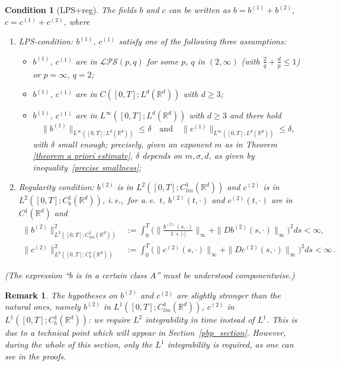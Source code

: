 \documentclass[a4paper,10pt]{article}
\newtheorem{condition}[theorem]{Condition}
\newtheorem{remark}[theorem]{Remark}
\begin{document}
\begin{condition}[LPS+reg]
\label{LPSreg}
The fields $b$ and $c$ can be written as $b=b^{(1)}+b^{(2)}$, $c=c^{(1)}+c^{(2)}$, where 
\begin{enumerate}
\item LPS-condition: $b^{(1)}$, $c^{(1)}$ satisfy one of the following three assumptions:
 \begin{itemize}
   \item[a)] $b^{(1)}$, $c^{(1)}$ are in $\mathcal{LPS}(p,q)$ for some $p$, $q$ in
$(2,\infty)$ (with $\frac2q+\frac{d}{p}\le1$) or $p=\infty$, $q=2$;
   \item[b)] $b^{(1)}$, $c^{(1)}$ are in $C([0,T];L^{d}(\mathbb{R}^{d}))$ with $d \geq 3$;
   \item[c)] $b^{(1)}$, $c^{(1)}$ are in $L^{\infty}([0,T];L^{d}(\mathbb{R}^{d}))$
with $d \geq 3$ and there hold
\[
\|b^{(1)}\|_{L^{\infty}([0,T];L^{d}(\mathbb{R}^{d}))}\le\delta \quad \text{and} \quad
\|c^{(1)}\|_{L^{\infty}([0,T];L^{d}(\mathbb{R}^{d}))} \le\delta,
\]
with $\delta$ small enough; precisely, given an exponent $m$ as in Theorem
\ref{theorem a priori estimate}, $\delta$ depends on $m,\sigma,d$, as given by
inequality~\eqref{precise smallness};
 \end{itemize}
   
\item Regularity condition: $b^{(2)}$ is in $L^{2}([0,T];C^{1}_{lin}(\mathbb{R}^{d}))$ and $c^{(2)}$
is in $L^{2}([0,T];C^{1}_{b}(\mathbb{R}^{d}))$, i.\,e.,\ for a.\,e.\ $t$,
$b^{(2)}(t,\cdot)$ and $c^{(2)}(t,\cdot)$ are in $C^{1}(\mathbb{R}^{d})$ and
\begin{align*}
\|b^{(2)}\|_{L^{2}([0,T];C^{1}_{lin}(\mathbb{R}^{d}))}^2 & :=\int^{T}_{0}\Big(
\Big\| \frac{b^{(2)}(s,\cdot)}{1+|\cdot|}\Big\|_{\infty}+\|Db^{(2)} 
(s,\cdot)\|_{\infty}\Big)^2 ds<\infty,\\
\|c^{(2)}\|_{L^{2}([0,T];C^{1}_{b}(\mathbb{R}^{d}))}^2 & :=\int^{T}_{0}\Big(
\|c^{(2)}(s,\cdot)\|_{\infty}+\|Dc^{(2)}(s,\cdot)\|_{\infty}\Big)^2 ds<\infty \,.
\end{align*}

\end{enumerate}

(The expression ``$b$ is in a certain class $A$'' must be understood componentwise.)
\end{condition}

\begin{remark}\label{L2time}
The hypotheses on $b^{(2)}$ and $c^{(2)}$ are slightly stronger than the natural ones, namely $b^{(2)}$ in $L^{1}([0,T];C^{1}_{lin}(\mathbb{R}^{d}))$, $c^{(2)}$ in $L^{1}([0,T];C^{1}_{b}(\mathbb{R}^{d}))$: we require $L^2$ integrability in time instead of $L^1$. This is due to a technical point which will appear in Section~\ref{pbp_section}. However, during the whole of this section, only the $L^1$ integrability is required, as one can see in the proofs.
\end{remark}
\end{document}
